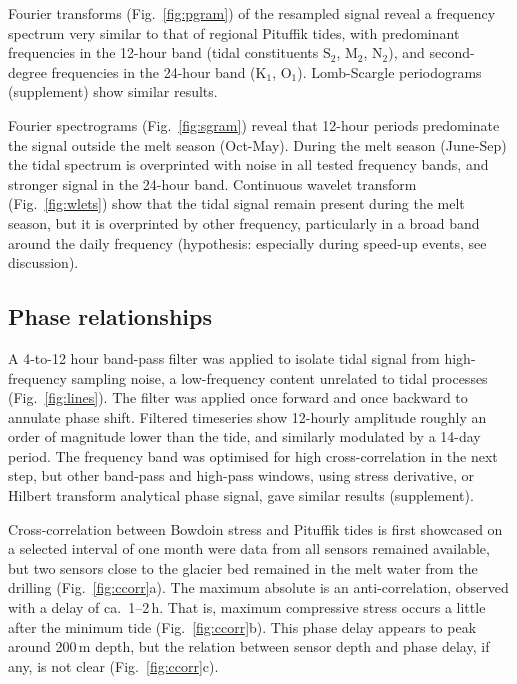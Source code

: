 \documentclass[utf8]{article}
\begin{document}
    Fourier transforms (Fig.~\ref{fig:pgram}) of the resampled signal reveal a
    frequency spectrum very similar to that of regional Pituffik tides, with
    predominant frequencies in the 12-hour band (tidal constituents
    $\mathrm{S_2}$, $\mathrm{M_2}$, $\mathrm{N_2}$), and second-degree
    frequencies in the 24-hour band ($\mathrm{K_1}$, $\mathrm{O_1}$).
    Lomb-Scargle periodograms (supplement) show similar results.

    Fourier spectrograms (Fig.~\ref{fig:sgram}) reveal that 12-hour periods
    predominate the signal outside the melt season (Oct-May). During the melt
    season (June-Sep) the tidal spectrum is overprinted with noise in all
    tested frequency bands, and stronger signal in the 24-hour band.
    Continuous wavelet transform (Fig.~\ref{fig:wlets}) show that the tidal
    signal remain present during the melt season, but it is overprinted by
    other frequency, particularly in a broad band around the daily frequency
    (hypothesis: especially during speed-up events, see discussion).

\subsection{Phase relationships}

    A 4-to-12 hour band-pass filter was applied to isolate tidal signal from
    high-frequency sampling noise, a low-frequency content unrelated to tidal
    processes (Fig.~\ref{fig:lines}). The filter was applied once forward and
    once backward to annulate phase shift. Filtered timeseries show 12-hourly
    amplitude roughly an order of magnitude lower than the tide, and similarly
    modulated by a 14-day period. The frequency band was optimised for high
    cross-correlation in the next step, but other band-pass and high-pass
    windows, using stress derivative, or Hilbert transform analytical phase
    signal, gave similar results (supplement).

    Cross-correlation between Bowdoin stress and Pituffik tides is first
    showcased on a selected interval of one month were data from all sensors
    remained available, but two sensors close to the glacier bed remained in
    the melt water from the drilling (Fig.~\ref{fig:ccorr}a). The maximum
    absolute is an anti-correlation, observed with a delay of ca.~1--2\,h.
    That is, maximum compressive stress occurs a little after the minimum tide
    (Fig.~\ref{fig:ccorr}b). This phase delay appears to peak around 200\,m
    depth, but the relation between sensor depth and phase delay, if any, is
    not clear (Fig.~\ref{fig:ccorr}c).
\end{document}
